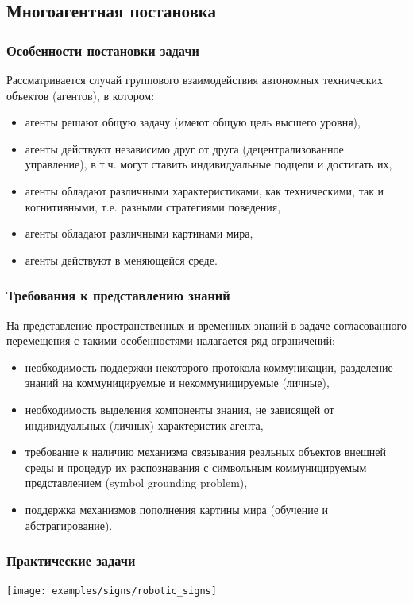 \documentclass[default]{beamer}
\begin{document}
	\subsection{Многоагентная постановка}
	\begin{frame}
		\frametitle{Особенности постановки задачи}
		
		Рассматривается случай группового взаимодействия автономных технических объектов (агентов), в котором:
		\begin{itemize}
			\item агенты решают общую задачу (имеют общую цель высшего уровня),
			\item агенты действуют независимо друг от друга (децентрализованное управление), в т.ч. могут ставить индивидуальные подцели и достигать их,
			\item агенты обладают различными характеристиками, как техническими, так и когнитивными, т.е. разными стратегиями поведения,
			\item агенты обладают различными картинами мира,
			\item агенты действуют в меняющейся среде.
		\end{itemize}
		
	\end{frame}
	
	\begin{frame}
		\frametitle{Требования к представлению знаний}
		
		На представление пространственных и временных знаний в задаче согласованного перемещения с такими особенностями налагается ряд ограничений:
		\begin{itemize}
			\item необходимость поддержки некоторого протокола коммуникации, разделение знаний на коммуницируемые и некоммуницируемые (личные),
			\item необходимость выделения компоненты знания, не зависящей от индивидуальных (личных) характеристик агента,
			\item требование к наличию механизма связывания реальных объектов внешней среды и процедур их распознавания с символьным коммуницируемым представлением (symbol grounding problem),
			\item поддержка механизмов пополнения картины мира (обучение и абстрагирование).
		\end{itemize}
	\end{frame}

	\begin{frame}
		\frametitle{Практические задачи}
		
		\centering
		\texttt{[image: examples/signs/robotic\_signs]}

	\end{frame}
	
\end{document}
